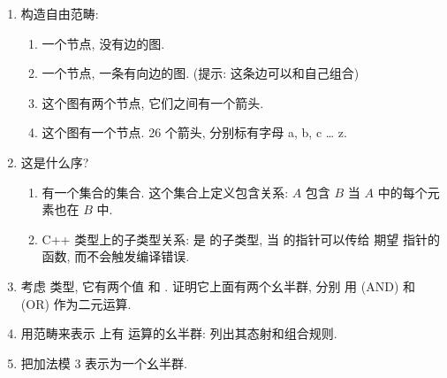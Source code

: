 \begin{enumerate}
  \tightlist
  \item
        构造自由范畴:

        \begin{enumerate}
          \tightlist
          \item
                一个节点, 没有边的图.
          \item
                一个节点, 一条有向边的图. (提示: 这条边可以和自己组合)
          \item
                这个图有两个节点, 它们之间有一个箭头.
          \item
                这个图有一个节点. 26 个箭头, 分别标有字母 a, b, c \ldots{} z.
        \end{enumerate}
  \item
        这是什么序?

        \begin{enumerate}
          \tightlist
          \item
                有一个集合的集合. 这个集合上定义包含关系: $A$ 包含 $B$ 当 $A$ 中的每个元素也在 $B$ 中.
          \item
                C++ 类型上的子类型关系:  是  的子类型, 当  的指针可以传给
                期望  指针的函数, 而不会触发编译错误.
        \end{enumerate}
  \item
        考虑  类型, 它有两个值  和 . 证明它上面有两个幺半群, 分别
        用 \code{\&\&} (AND) 和 \code{||} (OR) 作为二元运算.
  \item
        用范畴来表示  上有  运算的幺半群: 列出其态射和组合规则.
  \item
        把加法模 3 表示为一个幺半群.
\end{enumerate}
